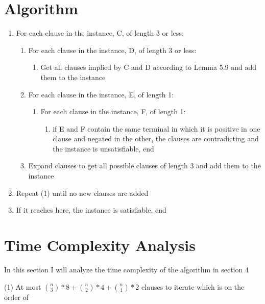 \documentclass[manuscript]{acmart}
\begin{document}
    \section{Algorithm}

    \begin{enumerate}
        \item For each clause in the instance, C, of length 3 or less:
        \begin{enumerate}
            \item For each clause in the instance, D, of length 3 or less:
            \begin{enumerate}
                \item Get all clauses implied by C and D according to Lemma 5.9 
                and add them to the instance
            \end{enumerate}
            \item For each clause in the instance, E, of length 1:
            \begin{enumerate}
                \item For each clause in the instance, F, of length 1:
                \begin{enumerate}
                    \item if E and F contain the same terminal in which it is 
                    positive in one clause and negated in the other, the 
                    clauses are contradicting and the instance is unsatisfiable, end
                \end{enumerate}
            \end{enumerate}
        \item Expand clauses to get all possible clauses of length 3 and add them to the instance
        \end{enumerate}
        \item Repeat (1) until no new clauses are added
        \item If it reaches here, the instance is satisfiable, end
    \end{enumerate}

    \section{Time Complexity Analysis}

    In this section I will analyze the time complexity of the algorithm in section 4

    (1) At most ${\binom{n}{3}}*8 + {\binom{n}{2}}*4 + {\binom{n}{1}}*2$ clauses to iterate which is on the order of
\end{document}

